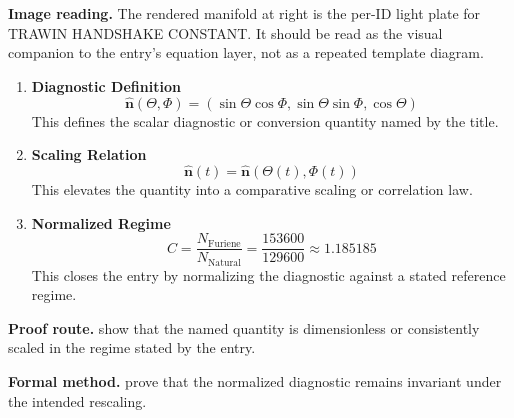\begin{samepage}
\noindent\begin{minipage}[t]{0.45\linewidth}
\vspace{0pt}
\raggedright
\scriptsize\textbf{Image reading.} The rendered manifold at right is the per-ID light plate for TRAWIN HANDSHAKE CONSTANT. It should be read as the visual companion to the entry's equation layer, not as a repeated template diagram.\par
\end{minipage}\hfill
\begin{minipage}[t]{0.53\linewidth}
\vspace*{-0.10in}
\raggedright
{}
\end{minipage}
\end{samepage}

\clearpage


\begin{enumerate}[leftmargin=1.6em,itemsep=9pt,topsep=6pt]
\item \textbf{Diagnostic Definition}
\[
\widehat{\mathbf{n}}(\Theta,\Phi)
=
(\sin\Theta\cos\Phi,\sin\Theta\sin\Phi,\cos\Theta)
\]
This defines the scalar diagnostic or conversion quantity named by the title.

\item \textbf{Scaling Relation}
\[
\widehat{\mathbf{n}}(t)
=
\widehat{\mathbf{n}}(\Theta(t),\Phi(t))
\]
This elevates the quantity into a comparative scaling or correlation law.

\item \textbf{Normalized Regime}
\[
C
=
\frac{N_{\mathrm{Furiene}}}{N_{\mathrm{Natural}}}
=
\frac{153600}{129600}
\approx1.185185
\]
This closes the entry by normalizing the diagnostic against a stated reference regime.
\end{enumerate}

\textbf{Proof route.} show that the named quantity is dimensionless or consistently scaled in the regime stated by the entry.

\textbf{Formal method.} prove that the normalized diagnostic remains invariant under the intended rescaling.

\medskip
{}

